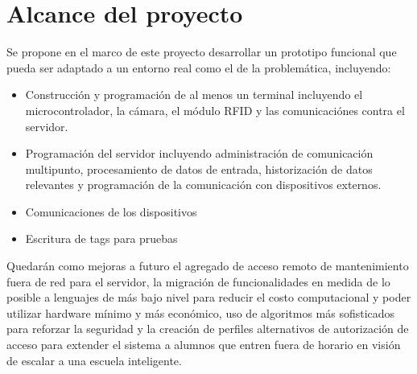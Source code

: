 \section{Alcance del proyecto}
Se propone en el marco de este proyecto desarrollar un prototipo funcional que pueda ser adaptado a un entorno real como el de la problemática, incluyendo:

\begin{itemize}
	\item Construcción y programación de al menos un terminal incluyendo el microcontrolador, la cámara, el módulo RFID y las comunicaciónes contra el servidor.
	\item Programación del servidor incluyendo administración de comunicación multipunto, procesamiento de datos de entrada, historización de datos relevantes y programación de la comunicación con dispositivos externos.
	\item Comunicaciones de los dispositivos
	\item Escritura de tags para pruebas
\end{itemize}


Quedarán como mejoras a futuro el agregado de acceso remoto de mantenimiento fuera de red para el servidor, la migración de funcionalidades en medida de lo posible a lenguajes de más bajo nivel para reducir el costo computacional y poder utilizar hardware mínimo y más económico, uso de algoritmos más sofisticados para reforzar la seguridad y la creación de perfiles alternativos de autorización  de acceso para extender el sistema a alumnos que entren fuera de horario en visión de escalar a una escuela inteligente.